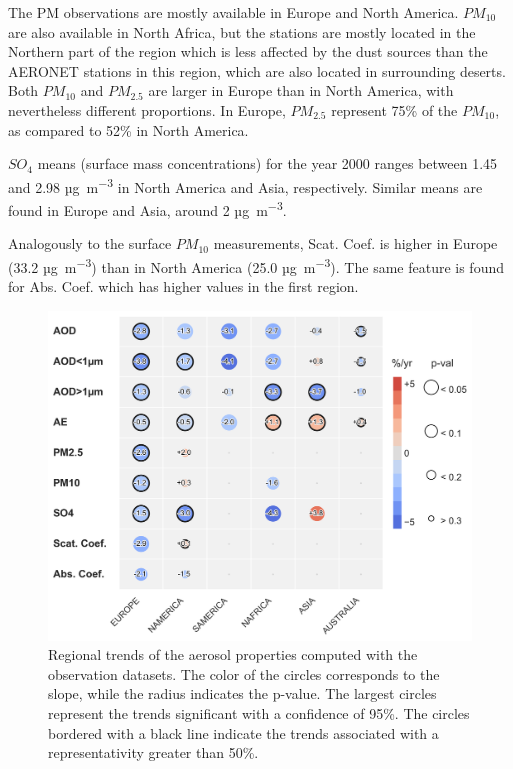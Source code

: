 \documentclass[journal abbreviation, manuscript]{copernicus}
\begin{document}
The PM observations are mostly available in Europe and North America. $PM_{10}$ are also available in North Africa, but the stations are mostly located in the Northern part of the region which is less affected by the dust sources than the AERONET stations in this region, which are also located in surrounding deserts. Both $PM_{10}$ and $PM_{2.5}$ are larger in Europe than in North America, with nevertheless different proportions. In Europe, $PM_{2.5}$ represent 75\% of the $PM_{10}$, as compared to 52\% in North America.

$SO_{4}$ means (surface mass concentrations) for the year 2000 ranges between 1.45 and 2.98 \unit{µg.m^{-3}} in North America and Asia, respectively. Similar means are found in Europe and Asia, around 2 \unit{µg.m^{-3}}.

Analogously to the surface $PM_{10}$ measurements, Scat. Coef. is higher in Europe (33.2 \unit{µg.m^{-3}}) than in North America (25.0 \unit{µg.m^{-3}}). The same feature is found for Abs. Coef. which has higher values in the first region.

\begin{figure}[t]
 \includegraphics[width=12cm]{../scripts/figs/heatmaps/OBS.png}
 \caption{Regional trends of the aerosol properties computed with the observation datasets. The color of the circles corresponds to the slope, while the radius indicates the p-value. The largest circles represent the trends significant with a confidence of 95\%. The circles bordered with a black line indicate the trends associated with a representativity greater than 50\%.}
 \label{fig:obs_trends}
\end{figure}
\end{document}
